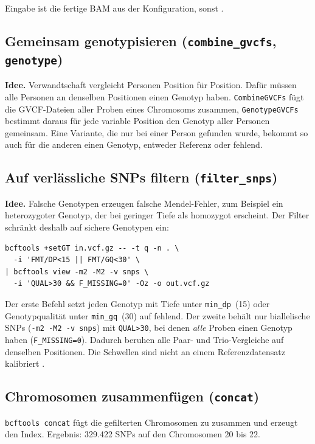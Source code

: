\documentclass[10pt,a4paper,twocolumn]{article}
\begin{document}
Eingabe ist die fertige BAM aus der Konfiguration, sonst .

\subsection{Gemeinsam genotypisieren (\texttt{combine\_gvcfs}, \texttt{genotype})}
\textbf{Idee.} Verwandtschaft vergleicht Personen Position für Position. Dafür müssen alle Personen an denselben Positionen einen Genotyp haben. \texttt{CombineGVCFs} fügt die GVCF-Dateien aller Proben eines Chromosoms zusammen, \texttt{GenotypeGVCFs} bestimmt daraus für jede variable Position den Genotyp aller Personen gemeinsam. Eine Variante, die nur bei einer Person gefunden wurde, bekommt so auch für die anderen einen Genotyp, entweder Referenz oder fehlend.

\subsection{Auf verlässliche SNPs filtern (\texttt{filter\_snps})}
\textbf{Idee.} Falsche Genotypen erzeugen falsche Mendel-Fehler, zum Beispiel ein heterozygoter Genotyp, der bei geringer Tiefe als homozygot erscheint. Der Filter schränkt deshalb auf sichere Genotypen ein:
\begin{lstlisting}
bcftools +setGT in.vcf.gz -- -t q -n . \
  -i 'FMT/DP<15 || FMT/GQ<30' \
| bcftools view -m2 -M2 -v snps \
  -i 'QUAL>30 && F_MISSING=0' -Oz -o out.vcf.gz
\end{lstlisting}
Der erste Befehl setzt jeden Genotyp mit Tiefe unter \texttt{min\_dp}~(15) oder Genotypqualität unter \texttt{min\_gq}~(30) auf fehlend. Der zweite behält nur biallelische SNPs (\texttt{-m2 -M2 -v snps}) mit \texttt{QUAL>30}, bei denen \emph{alle} Proben einen Genotyp haben (\texttt{F\_MISSING=0}). Dadurch beruhen alle Paar- und Trio-Vergleiche auf denselben Positionen. Die Schwellen sind nicht an einem Referenzdatensatz kalibriert \citep{danecek2021}.

\subsection{Chromosomen zusammenfügen (\texttt{concat})}
\texttt{bcftools concat} fügt die gefilterten Chromosomen zu \pf{results/snps.vcf.gz} zusammen und erzeugt den Index. Ergebnis: 329.422 SNPs auf den Chromosomen 20 bis 22.
\end{document}
